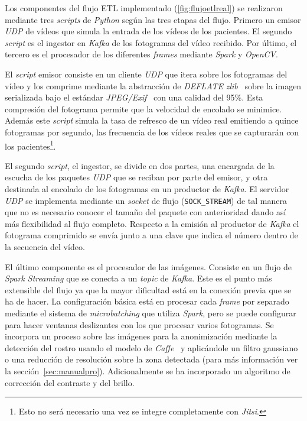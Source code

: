 Los componentes del flujo ETL implementado (\autoref{fig:flujoetlreal}) se realizaron mediante tres \textit{scripts} de \textit{Python} según las tres etapas del flujo. Primero un emisor \textit{UDP} de vídeos que simula la entrada de los vídeos de los pacientes. El segundo \textit{script} es el ingestor en \textit{Kafka} de los fotogramas del vídeo recibido. Por último, el tercero es el procesador de los diferentes \textit{frames} mediante \textit{Spark} y \textit{OpenCV}.

El \textit{script} emisor consiste en un cliente \textit{UDP} que itera sobre los fotogramas del vídeo y los comprime mediante la abstracción de \textit{DEFLATE} \textit{zlib}~\cite{tool:zlib} sobre la imagen serializada bajo el estándar \textit{JPEG/Exif}~\cite{pennebaker1992jpeg} con una calidad del 95\%. Esta compresión del fotograma permite que la velocidad de encolado se minimice. Además este \textit{script} simula la tasa de refresco de un vídeo real emitiendo a quince fotogramas por segundo, las frecuencia de los vídeos reales que se capturarán con los pacientes\footnote{Esto no será necesario una vez se integre completamente con \textit{Jitsi}.}.

El segundo \textit{script}, el ingestor, se divide en dos partes, una encargada de la escucha de los paquetes \textit{UDP} que se reciban por parte del emisor, y otra destinada al encolado de los fotogramas en un productor de \textit{Kafka}. El servidor \textit{UDP} se implementa  mediante un \textit{socket} de flujo (\texttt{SOCK\_STREAM}) de tal manera que no es necesario conocer el tamaño del paquete con anterioridad dando así más flexibilidad al flujo completo. Respecto a la emisión al productor de \textit{Kafka} el fotograma comprimido se envía junto a una clave que indica el número dentro de la secuencia del vídeo.

El último componente es el procesador de las imágenes. Consiste en un flujo de \textit{Spark Streaming} que se conecta a un \textit{topic} de \textit{Kafka}. Este es el punto más extensible del flujo ya que la mayor dificultad está en la conexión previa que se ha de hacer. La configuración básica está en procesar cada \textit{frame} por separado mediante el sistema de \textit{microbatching} que utiliza \textit{Spark}, pero se puede configurar para hacer ventanas deslizantes con los que procesar varios fotogramas. Se incorpora un proceso sobre las imágenes para la anonimización mediante la detección del rostro usando el modelo de \textit{Caffe}~\cite{jia2014caffe} y aplicándole un filtro gaussiano o una reducción de resolución sobre la zona detectada (para más información ver la sección~\ref{sec:manualpro}). Adicionalmente se ha incorporado un algoritmo de corrección del contraste y del brillo.

